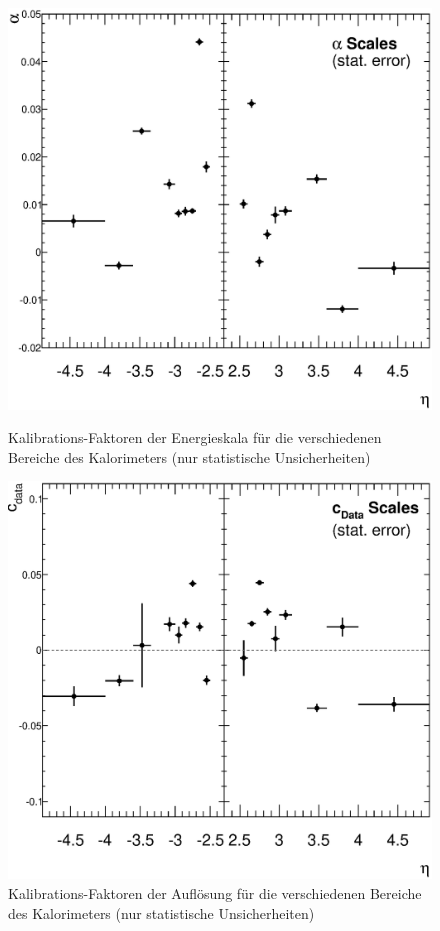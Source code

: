 \begin{figure}[h]
    \begin{minipage}{0.48\textwidth}
        \centering
        \includegraphics[width=1.\textwidth]{plots/alpha_stat}
        \captionsetup{format=plain}
        \caption{Kalibrations-Faktoren der Energieskala für die verschiedenen
            Bereiche des Kalorimeters (nur statistische Unsicherheiten)}
        \label{fig:alpha_stat}
    \end{minipage}
    \hfill
    \begin{minipage}{0.48\textwidth}
        \centering
        \includegraphics[width=1.\textwidth]{plots/cdata_stat}
        \captionsetup{format=plain}
        \caption{Kalibrations-Faktoren der Auflösung für die verschiedenen
            Bereiche des Kalorimeters (nur statistische Unsicherheiten)}
        \label{fig:cdata_stat}
    \end{minipage}
\end{figure}

